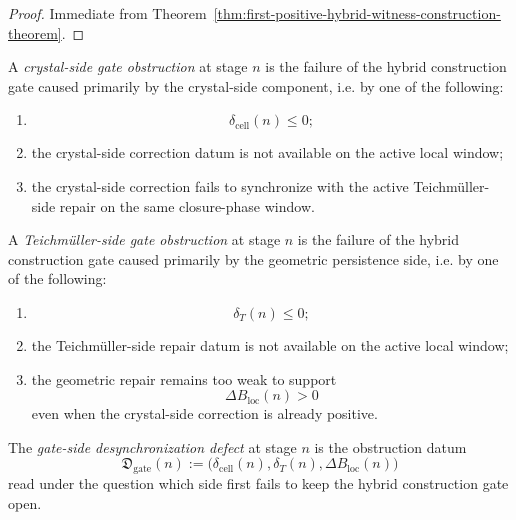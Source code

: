 \begin{proof}
Immediate from Theorem~\ref{thm:first-positive-hybrid-witness-construction-theorem}.
\end{proof}


\begin{definition}
\label{def:crystal-side-gate-obstruction}
A \emph{crystal-side gate obstruction} at stage $n$ is the failure of the hybrid construction gate caused primarily by the crystal-side component, i.e. by one of the following:
\begin{enumerate}[leftmargin=2em,label=(\alph*)]
 \item
 \[
 \delta_{\mathrm{cell}}(n)\le 0;
 \]
 \item the crystal-side correction datum is not available on the active local window;
 \item the crystal-side correction fails to synchronize with the active Teichm\"uller-side repair on the same closure-phase window.
\end{enumerate}
\end{definition}

\begin{definition}
\label{def:teichmueller-side-gate-obstruction}
A \emph{Teichm\"uller-side gate obstruction} at stage $n$ is the failure of the hybrid construction gate caused primarily by the geometric persistence side, i.e. by one of the following:
\begin{enumerate}[leftmargin=2em,label=(\alph*)]
 \item
 \[
 \delta_T(n)\le 0;
 \]
 \item the Teichm\"uller-side repair datum is not available on the active local window;
 \item the geometric repair remains too weak to support
 \[
 \Delta B_{\mathrm{loc}}(n)>0
 \]
 even when the crystal-side correction is already positive.
\end{enumerate}
\end{definition}

\begin{definition}
\label{def:gate-side-desynchronization-defect}
The \emph{gate-side desynchronization defect} at stage $n$ is the obstruction datum
\[
 \mathfrak D_{\mathrm{gate}}(n)
 :=
 \bigl(
 \delta_{\mathrm{cell}}(n),
 \delta_T(n),
 \Delta B_{\mathrm{loc}}(n)
 \bigr)
\]
read under the question which side first fails to keep the hybrid construction gate open.
\end{definition}


